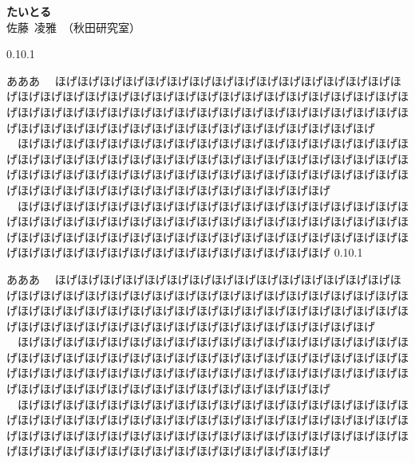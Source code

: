 \documentclass[autodetect-engine, dvipdfmx-if-dvi, ja=standard]{bxjsarticle}
\makeatletter
\renewcommand{\section}{%
    \@startsection{section}{1}{\z@}%
    {0.1\Cvs}{0.1\Cvs}%
    {\normalfont\large\headfont\raggedright}}
\makeatother
\begin{document}
\begin{center}
    \fontsize{14.053pt}{21.079pt}\selectfont
    {\bf たいとる}\\

    \fontsize{11.041pt}{16.562pt}\selectfont
    佐藤\ 凌雅\ （秋田研究室）
\end{center}


\begin{multicols}{2}
\fontsize{10.539pt}{15.809pt}\selectfont
\section{あああ}
　ほげほげほげほげほげほげほげほげほげほげほげほげほげほげほげほげほげほげほげほげほげほげほげほげほげほげほげほげほげほげほげほげほげほげほげほげほげほげほげほげほげほげほげほげほげほげほげほげほげほげほげほげほげほげほげほげほげほげほげほげほげほげほげほげほげほげほげほげ\\
　ほげほげほげほげほげほげほげほげほげほげほげほげほげほげほげほげほげほげほげほげほげほげほげほげほげほげほげほげほげほげほげほげほげほげほげほげほげほげほげほげほげほげほげほげほげほげほげほげほげほげほげほげほげほげほげほげほげほげほげほげほげほげほげほげほげほげほげほげ\\
　ほげほげほげほげほげほげほげほげほげほげほげほげほげほげほげほげほげほげほげほげほげほげほげほげほげほげほげほげほげほげほげほげほげほげほげほげほげほげほげほげほげほげほげほげほげほげほげほげほげほげほげほげほげほげほげほげほげほげほげほげほげほげほげほげほげほげほげほげ
\section{あああ}
　ほげほげほげほげほげほげほげほげほげほげほげほげほげほげほげほげほげほげほげほげほげほげほげほげほげほげほげほげほげほげほげほげほげほげほげほげほげほげほげほげほげほげほげほげほげほげほげほげほげほげほげほげほげほげほげほげほげほげほげほげほげほげほげほげほげほげほげほげ\\
　ほげほげほげほげほげほげほげほげほげほげほげほげほげほげほげほげほげほげほげほげほげほげほげほげほげほげほげほげほげほげほげほげほげほげほげほげほげほげほげほげほげほげほげほげほげほげほげほげほげほげほげほげほげほげほげほげほげほげほげほげほげほげほげほげほげほげほげほげ\\
　ほげほげほげほげほげほげほげほげほげほげほげほげほげほげほげほげほげほげほげほげほげほげほげほげほげほげほげほげほげほげほげほげほげほげほげほげほげほげほげほげほげほげほげほげほげほげほげほげほげほげほげほげほげほげほげほげほげほげほげほげほげほげほげほげほげほげほげほげ

\end{multicols}
\end{document}
